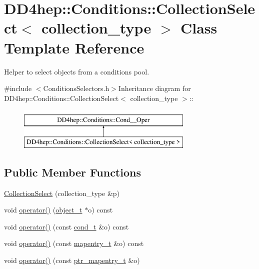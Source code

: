 \hypertarget{class_d_d4hep_1_1_conditions_1_1_collection_select}{
\section{DD4hep::Conditions::CollectionSelect$<$ collection\_\-type $>$ Class Template Reference}
\label{class_d_d4hep_1_1_conditions_1_1_collection_select}
}


Helper to select objects from a conditions pool.  


{\ttfamily \#include $<$ConditionsSelectors.h$>$}Inheritance diagram for DD4hep::Conditions::CollectionSelect$<$ collection\_\-type $>$::\begin{figure}[H]
\begin{center}
\leavevmode
\includegraphics[height=2cm]{class_d_d4hep_1_1_conditions_1_1_collection_select}
\end{center}
\end{figure}
\subsection*{Public Member Functions}
\begin{DoxyCompactItemize}
\item 
\hyperlink{class_d_d4hep_1_1_conditions_1_1_collection_select_a879f557b25aae1cd0608484eb0524929}{CollectionSelect} (collection\_\-type \&p)
\item 
void \hyperlink{class_d_d4hep_1_1_conditions_1_1_collection_select_ac8308f7a0fabe85fcc10901e49f363b8}{operator()} (\hyperlink{class_d_d4hep_1_1_conditions_1_1_interna_1_1_condition_object}{object\_\-t} $\ast$o) const 
\item 
void \hyperlink{class_d_d4hep_1_1_conditions_1_1_collection_select_ae4001ca41cdcd6a293eed61f1b3368d5}{operator()} (const \hyperlink{class_d_d4hep_1_1_conditions_1_1_condition}{cond\_\-t} \&o) const 
\item 
void \hyperlink{class_d_d4hep_1_1_conditions_1_1_collection_select_a58e22e3af53dd0f5ce1829ed048e7867}{operator()} (const \hyperlink{class_d_d4hep_1_1_conditions_1_1_cond_____oper_a877dac3da66795207aed15be219acbdc}{mapentry\_\-t} \&o) const 
\item 
void \hyperlink{class_d_d4hep_1_1_conditions_1_1_collection_select_a8015cdd01adc5d11fc52062df45e961e}{operator()} (const \hyperlink{class_d_d4hep_1_1_conditions_1_1_cond_____oper_a0949e4bd5f90cd3fae2394cf30983973}{ptr\_\-mapentry\_\-t} \&o)
\end{DoxyCompactItemize}
